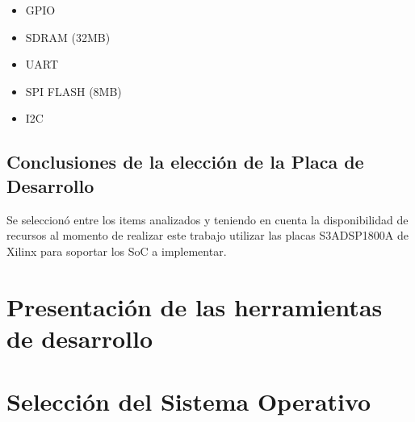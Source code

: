 				\begin{itemize}
				  	\item GPIO
					\item SDRAM (32MB)
					\item UART
					\item SPI FLASH (8MB)
					\item I2C
				\end{itemize}				
				
 		\subsection{Conclusiones de la elección de la Placa de Desarrollo}
 				Se seleccionó entre los items analizados y teniendo en cuenta la disponibilidad de recursos al momento de realizar este trabajo utilizar las
 				placas S3ADSP1800A de Xilinx para soportar los SoC a implementar.
 			
 		\section{Presentación de las herramientas de desarrollo} 	 
 		
 		
 		\section{Selección del Sistema Operativo}

			
 			
 
